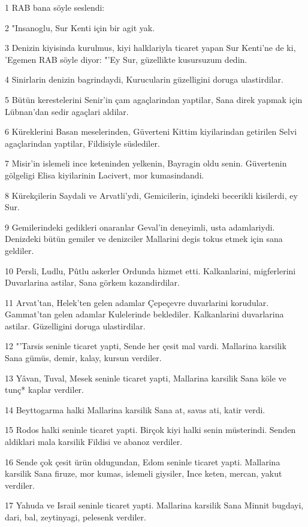 \par 1 RAB bana söyle seslendi:
\par 2 "Insanoglu, Sur Kenti için bir agit yak.
\par 3 Denizin kiyisinda kurulmus, kiyi halklariyla ticaret yapan Sur Kenti'ne de ki, 'Egemen RAB söyle diyor: "'Ey Sur, güzellikte kusursuzum dedin.
\par 4 Sinirlarin denizin bagrindaydi, Kurucularin güzelligini doruga ulastirdilar.
\par 5 Bütün kerestelerini Senir'in çam agaçlarindan yaptilar, Sana direk yapmak için Lübnan'dan sedir agaçlari aldilar.
\par 6 Küreklerini Basan meselerinden, Güverteni Kittim kiyilarindan getirilen Selvi agaçlarindan yaptilar, Fildisiyle süslediler.
\par 7 Misir'in islemeli ince keteninden yelkenin, Bayragin oldu senin. Güvertenin gölgeligi Elisa kiyilarinin Lacivert, mor kumasindandi.
\par 8 Kürekçilerin Saydali ve Arvatli'ydi, Gemicilerin, içindeki becerikli kisilerdi, ey Sur.
\par 9 Gemilerindeki gedikleri onaranlar Geval'in deneyimli, usta adamlariydi. Denizdeki bütün gemiler ve denizciler Mallarini degis tokus etmek için sana geldiler.
\par 10 Persli, Ludlu, Pûtlu askerler Ordunda hizmet etti. Kalkanlarini, migferlerini Duvarlarina astilar, Sana görkem kazandirdilar.
\par 11 Arvat'tan, Helek'ten gelen adamlar Çepeçevre duvarlarini korudular. Gammat'tan gelen adamlar Kulelerinde beklediler. Kalkanlarini duvarlarina astilar. Güzelligini doruga ulastirdilar.
\par 12 "'Tarsis seninle ticaret yapti, Sende her çesit mal vardi. Mallarina karsilik Sana gümüs, demir, kalay, kursun verdiler.
\par 13 Yâvan, Tuval, Mesek seninle ticaret yapti, Mallarina karsilik Sana köle ve tunç* kaplar verdiler.
\par 14 Beyttogarma halki Mallarina karsilik Sana at, savas ati, katir verdi.
\par 15 Rodos halki seninle ticaret yapti. Birçok kiyi halki senin müsterindi. Senden aldiklari mala karsilik Fildisi ve abanoz verdiler.
\par 16 Sende çok çesit ürün oldugundan, Edom seninle ticaret yapti. Mallarina karsilik Sana firuze, mor kumas, islemeli giysiler, Ince keten, mercan, yakut verdiler.
\par 17 Yahuda ve Israil seninle ticaret yapti. Mallarina karsilik Sana Minnit bugdayi, dari, bal, zeytinyagi, pelesenk verdiler.
